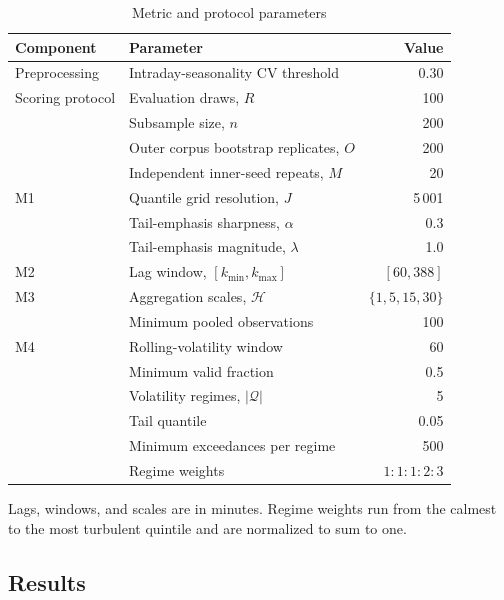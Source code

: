 \begin{table}[htbp]
\centering
\caption{Metric and protocol parameters }
\label{tab:config}
\small
\begin{tabular}{@{}llr@{}}
\toprule
Component & Parameter & Value \\
\midrule
Preprocessing & Intraday-seasonality CV threshold & 0.30 \\
Scoring protocol & Evaluation draws, $R$ & 100 \\
                 & Subsample size, $n$ & 200 \\
                 & Outer corpus bootstrap replicates, $O$ & 200 \\
                 & Independent inner-seed repeats, $M$ & 20 \\
\addlinespace
M1 & Quantile grid resolution, $J$ & 5\,001 \\
   & Tail-emphasis sharpness, $\alpha$ & 0.3 \\
   & Tail-emphasis magnitude, $\lambda$ & 1.0 \\
\addlinespace
M2 & Lag window, $[k_{\min}, k_{\max}]$ & $[60, 388]$ \\
\addlinespace
M3 & Aggregation scales, $\mathcal{H}$ & $\{1, 5, 15, 30\}$ \\
   & Minimum pooled observations & 100 \\
\addlinespace
M4 & Rolling-volatility window & 60 \\
   & Minimum valid fraction & 0.5 \\
   & Volatility regimes, $|\mathcal{Q}|$ & 5 \\
   & Tail quantile & 0.05 \\
   & Minimum exceedances per regime & 500 \\
   & Regime weights & $1{:}1{:}1{:}2{:}3$ \\
\bottomrule
\end{tabular}
\par\vspace{2pt}
\footnotesize
Lags, windows, and scales are in minutes. Regime weights run from the
calmest to the most turbulent quintile and are normalized to sum to one.
\end{table}


\subsection{Results}\label{sec:results}


